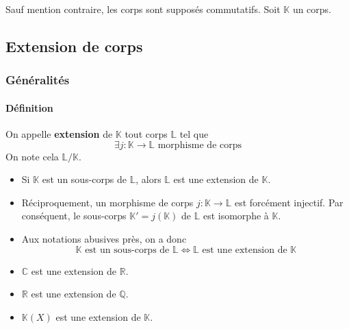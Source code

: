 




	Sauf mention contraire, les corps sont supposés commutatifs. Soit $\mathbb{K}$ un corps.

	\subsection{Extension de corps}

	\subsubsection{Généralités}

	\paragraph{Définition}


	\begin{definition}
		On appelle \textbf{extension} de $\mathbb{K}$ tout corps $\mathbb{L}$ tel que
		\[ \exists j : \mathbb{K} \rightarrow \mathbb{L} \text{ morphisme de corps} \]
		On note cela $\mathbb{L}/\mathbb{K}$.
	\end{definition}

	\begin{remark}
		\begin{itemize}
			\item Si $\mathbb{K}$ est un sous-corps de $\mathbb{L}$, alors $\mathbb{L}$ est une extension de $\mathbb{K}$.
			\item Réciproquement, un morphisme de corps $j : \mathbb{K} \rightarrow \mathbb{L}$ est forcément injectif. Par conséquent, le sous-corps $\mathbb{K}' = j(\mathbb{K})$ de $\mathbb{L}$ est isomorphe à $\mathbb{K}$.
			\item Aux notations abusives près, on a donc
			\[ \mathbb{K} \text{ est un sous-corps de } \mathbb{L} \iff \mathbb{L} \text{ est une extension de } \mathbb{K} \]
		\end{itemize}
	\end{remark}

	\begin{example}
		\begin{itemize}
			\item $\mathbb{C}$ est une extension de $\mathbb{R}$.
			\item $\mathbb{R}$ est une extension de $\mathbb{Q}$.
			\item $\mathbb{K}(X)$ est une extension de $\mathbb{K}$.
		\end{itemize}
	\end{example}

